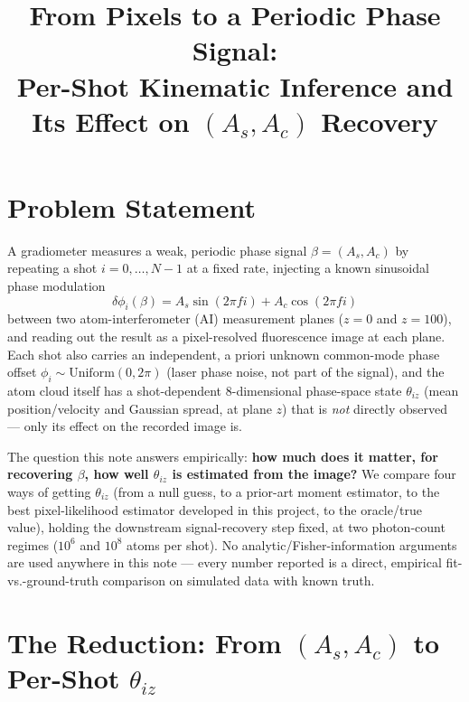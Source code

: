 \documentclass[11pt,a4paper]{article}
\title{%
  From Pixels to a Periodic Phase Signal:\\
  Per-Shot Kinematic Inference and Its Effect on $(A_s,A_c)$ Recovery
}
\author{}
\date{}
\begin{document}
\maketitle
\tableofcontents
\newpage

\section{Problem Statement}
\label{sec:problem}

A gradiometer measures a weak, periodic phase signal $\beta=(A_s,A_c)$ by
repeating a shot $i=0,\dots,N-1$ at a fixed rate, injecting a known
sinusoidal phase modulation
\begin{equation}
  \delta\phi_i(\beta) = A_s\sin(2\pi f i) + A_c\cos(2\pi f i)
  \label{eq:dphi}
\end{equation}
between two atom-interferometer (AI) measurement planes ($z=0$ and
$z=100$), and reading out the result as a pixel-resolved fluorescence image
at each plane. Each shot also carries an independent, a priori unknown
common-mode phase offset $\phi_i\sim\mathrm{Uniform}(0,2\pi)$ (laser phase
noise, not part of the signal), and the atom cloud itself has a shot-dependent
8-dimensional phase-space state $\theta_{iz}$ (mean position/velocity and
Gaussian spread, at plane $z$) that is \emph{not} directly observed --- only
its effect on the recorded image is.

The question this note answers empirically: \textbf{how much does it matter,
for recovering $\beta$, how well $\theta_{iz}$ is estimated from the image?}
We compare four ways of getting $\theta_{iz}$ (from a null guess, to a
prior-art moment estimator, to the best pixel-likelihood estimator developed
in this project, to the oracle/true value), holding the downstream
signal-recovery step fixed, at two photon-count regimes ($10^6$ and $10^8$
atoms per shot). No analytic/Fisher-information arguments are used anywhere
in this note --- every number reported is a direct, empirical
fit-vs.-ground-truth comparison on simulated data with known truth.

\section{The Reduction: From $(A_s,A_c)$ to Per-Shot $\theta_{iz}$}
\label{sec:reduction}
\end{document}
